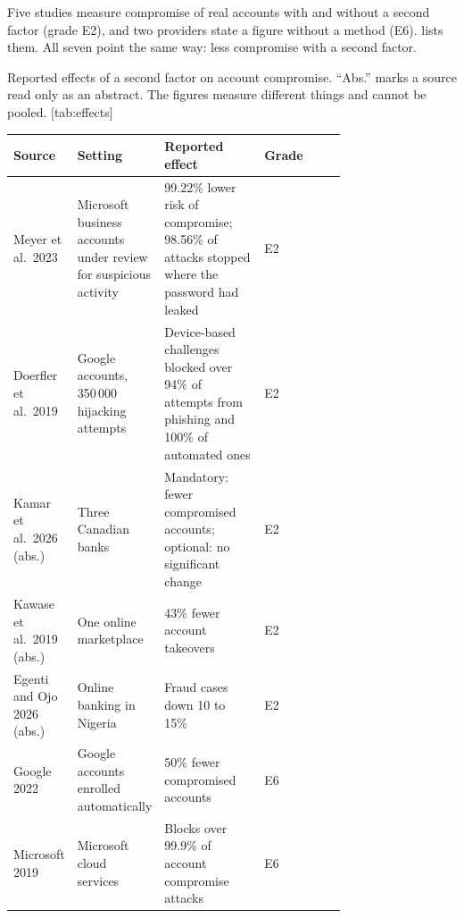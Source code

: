 Five studies measure compromise of real accounts with and without a
second factor (grade E2), and two providers state a figure without a
method (E6).
 lists them.
All seven point the same way: less compromise with a second factor.
\begin{table}
  \begin{sidecaption}{%
    Reported effects of a second factor on account compromise.
    \enquote{Abs.} marks a source read only as an abstract.
    The figures measure different things and cannot be pooled.
  }[tab:effects]
    \footnotesize
    \begin{tabular}{@{}L{0.19\linewidth}L{0.25\linewidth}L{0.30\linewidth}l@{}}
      \toprule
      Source & Setting & Reported effect & Grade \\
      \midrule
      Meyer et al.\ 2023
        & Microsoft business accounts under review for suspicious
          activity
        & 99.22\% lower risk of compromise; 98.56\% of attacks stopped
          where the password had leaked
        & E2 \\
      Doerfler et al.\ 2019
        & Google accounts, 350\,000 hijacking attempts
        & Device-based challenges blocked over 94\% of attempts from
          phishing and 100\% of automated ones
        & E2 \\
      Kamar et al.\ 2026 (abs.)
        & Three Canadian banks
        & Mandatory: fewer compromised accounts; optional: no
          significant change
        & E2 \\
      Kawase et al.\ 2019 (abs.)
        & One online marketplace
        & 43\% fewer account takeovers
        & E2 \\
      Egenti and Ojo 2026 (abs.)
        & Online banking in Nigeria
        & Fraud cases down 10 to 15\%
        & E2 \\
      Google 2022
        & Google accounts enrolled automatically
        & 50\% fewer compromised accounts
        & E6 \\
      Microsoft 2019
        & Microsoft cloud services
        & Blocks over 99.9\% of account compromise attacks
        & E6 \\
      \bottomrule
    \end{tabular}
  \end{sidecaption}
\end{table}

